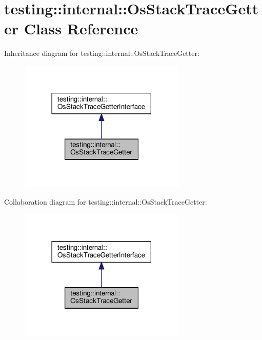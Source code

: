 \hypertarget{classtesting_1_1internal_1_1_os_stack_trace_getter}{}\section{testing\+:\+:internal\+:\+:Os\+Stack\+Trace\+Getter Class Reference}
\label{classtesting_1_1internal_1_1_os_stack_trace_getter}


Inheritance diagram for testing\+:\+:internal\+:\+:Os\+Stack\+Trace\+Getter\+:
\nopagebreak
\begin{figure}[H]
\begin{center}
\leavevmode
\includegraphics[width=225pt]{classtesting_1_1internal_1_1_os_stack_trace_getter__inherit__graph}
\end{center}
\end{figure}


Collaboration diagram for testing\+:\+:internal\+:\+:Os\+Stack\+Trace\+Getter\+:
\nopagebreak
\begin{figure}[H]
\begin{center}
\leavevmode
\includegraphics[width=225pt]{classtesting_1_1internal_1_1_os_stack_trace_getter__coll__graph}
\end{center}
\end{figure}
